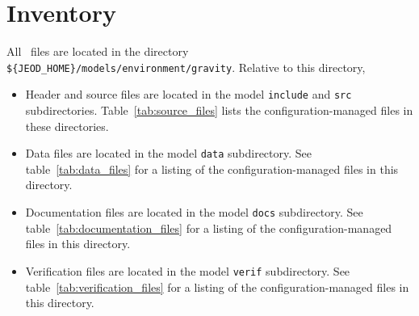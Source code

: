 %
%
%


\section{Inventory}
All \ModelDesc\ files are located in the directory \newline
{\tt \$\{JEOD\_HOME\}/models/environment/gravity}.
Relative to this directory,
\begin{itemize}
\vspace{-0.2\baselineskip}
\item Header and source files are located
in the model {\tt include} and {\tt src} subdirectories.
Table~\ref{tab:source_files} lists the
configuration-managed files in these directories.
\vspace{-0.1\baselineskip}
\item Data files are located in the model {\tt data} subdirectory.
See table~\ref{tab:data_files}
for a listing of the
configuration-managed files in this directory.
\vspace{-0.1\baselineskip}
\item Documentation files are located in the model {\tt docs} subdirectory.
See table~\ref{tab:documentation_files}
for a listing of the
configuration-managed files in this directory.
\vspace{-0.1\baselineskip}
\item Verification files are located in the model {\tt verif} subdirectory.
See table~\ref{tab:verification_files}
for a listing of the
configuration-managed files in this directory.
\end{itemize}


